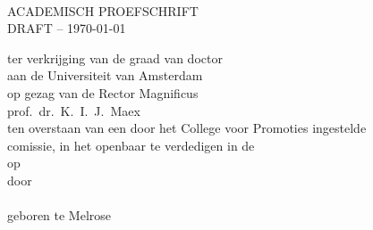 
%
%

\pagestyle{empty}
\setlength\parindent{0pt}

\makeatletter
{}
\makeatother



\begin{minipage}[c][190mm][c]{124mm}  %
\makeatletter
\begin{center}
	\vspace*{1.2cm}

	{ \huge \bf \@title }\\[2.7cm]

	\textsc{\Large ACADEMISCH PROEFSCHRIFT}\\[1.2cm]
	\ifdraft \textsc{\Large DRAFT -- \today}\\[1.0cm] \fi

	\linespread{1.2}
	\large \textrm{
		ter verkrijging van de graad van doctor \\
		aan de Universiteit van Amsterdam \\
		op gezag van de Rector Magnificus \\
		prof.~dr.~K.~I.~J.~Maex \\
		ten overstaan van een door het College voor Promoties ingestelde \\
	  comissie, in het openbaar te verdedigen in de \@location \\
		op \@date \\
		\vspace{0.9cm}
		door \\[0.3cm]
		\vspace{0.9cm}
		{\bf \@author}\\[0.3cm]
 		geboren te Melrose \\[0.3cm]
	 }
\end{center}
\makeatother
\end{minipage}

